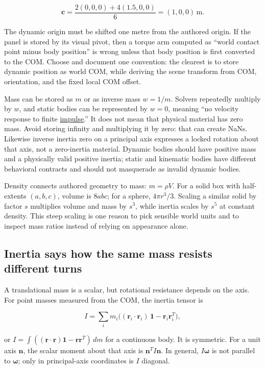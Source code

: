 \[
\mathbf c=\frac{2(0,0,0)+4(1.5,0,0)}{6}=(1,0,0)\,\mathrm m.
\]

The dynamic origin must be shifted one metre from the authored origin. If the panel is stored by its visual pivot, then a torque arm computed as ``world contact point minus body position'' is wrong unless that body position is first converted to the COM. Choose and document one convention: the clearest is to store dynamic position as world COM, while deriving the scene transform from COM, orientation, and the fixed local COM offset.

Mass can be stored as \(m\) or as inverse mass \(w=1/m\). Solvers repeatedly multiply by \(w\), and static bodies can be represented by \(w=0\), meaning ``no velocity response to finite \hyperref[appendix-c39931e6e4c2]{impulse}.'' It does not mean that physical material has zero mass. Avoid storing infinity and multiplying it by zero: that can create NaNs. Likewise inverse inertia zero on a principal axis expresses a locked rotation about that axis, not a zero-inertia material. Dynamic bodies should have positive mass and a physically valid positive inertia; static and kinematic bodies have different behavioral contracts and should not masquerade as invalid dynamic bodies.

Density connects authored geometry to mass: \(m=\rho V\). For a solid box with half-extents \((a,b,c)\), volume is \(8abc\); for a sphere, \(4\pi r^3/3\). Scaling a similar solid by factor \(s\) multiplies volume and mass by \(s^3\), while inertia scales by \(s^5\) at constant density. This steep scaling is one reason to pick sensible world units and to inspect mass ratios instead of relying on appearance alone.

\subsection{Inertia says how the same mass resists different turns}\label{06-engine-ii-ch034-inertia-says-how-the-same-mass-resists-different-turns}

\hypertarget{06-engine-ii-ch034-inertia-says-how-the-same-mass-resists-different-turns}{}

A translational mass is a scalar, but rotational resistance depends on the axis. For point masses measured from the COM, the inertia tensor is

\[
I=\sum_i m_i\big((\mathbf r_i\cdot\mathbf r_i)\,\mathbf 1-\mathbf r_i\mathbf r_i^T\big),
\]

or \(I=\int((\mathbf r\cdot\mathbf r)\mathbf 1-\mathbf r\mathbf r^T)\,dm\) for a continuous body. It is symmetric. For a unit axis \(\mathbf n\), the scalar moment about that axis is \(\mathbf n^T I\mathbf n\). In general, \(I\boldsymbol\omega\) is not parallel to \(\boldsymbol\omega\); only in principal-axis coordinates is \(I\) diagonal.

